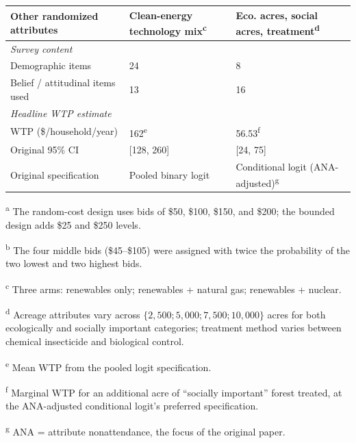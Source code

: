 \begin{table}[h]
{\begin{threeparttable}
\begin{tabular}{lll}
        Other randomized attributes        & Clean-energy technology mix\textsuperscript{c}    & Eco. acres, social acres, treatment\textsuperscript{d} \\
        \midrule
        \multicolumn{3}{l}{\textit{Survey content}} \\
        Demographic items                  & 24                  & 8 \\
        Belief / attitudinal items used    & 13                              & 16 \\
        \midrule
        \multicolumn{3}{l}{\textit{Headline WTP estimate}} \\
        WTP (\$/household/year)            & 162\textsuperscript{e}         & 56.53\textsuperscript{f} \\
        Original 95\% CI                   & [128, 260]                     & [24, 75] \\
        Original specification             & Pooled binary logit            & Conditional logit (ANA-adjusted)\textsuperscript{g} \\
        \bottomrule
    \end{tabular}
    \begin{tablenotes}\footnotesize
        \item \textsuperscript{a} The random-cost design uses bids of \$50, \$100, \$150, and \$200; the bounded design adds \$25 and \$250 levels.
        \item \textsuperscript{b} The four middle bids (\$45--\$105) were assigned with twice the probability of the two lowest and two highest bids.
        \item \textsuperscript{c} Three arms: renewables only; renewables + natural gas; renewables + nuclear.
        \item \textsuperscript{d} Acreage attributes vary across $\{2{,}500; 5{,}000; 7{,}500; 10{,}000\}$ acres for both ecologically and socially important categories; treatment method varies between chemical insecticide and biological control.
        \item \textsuperscript{e} Mean WTP from the pooled logit specification.
        \item \textsuperscript{f} Marginal WTP for an additional acre of ``socially important'' forest treated, at the ANA-adjusted conditional logit's preferred specification.
        \item \textsuperscript{g} ANA = attribute nonattendance, the focus of the original paper.
    \end{tablenotes}
    \end{threeparttable}
    }
\end{table}